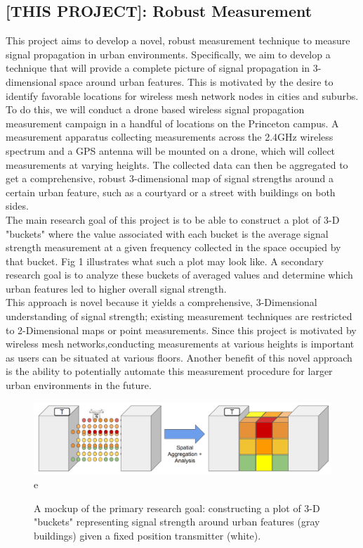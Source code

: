 \documentclass[pageno]{jpaper}
\begin{document}
\subsection{[THIS PROJECT]: Robust Measurement}
This project aims to develop a novel, robust measurement technique to measure signal propagation in urban environments. Specifically, we aim to develop a technique that will provide a complete picture of signal propagation in 3-dimensional space around urban features. This is motivated by the desire to identify favorable locations for wireless mesh network nodes in cities and suburbs. \\
To do this, we will conduct a drone based wireless signal propagation measurement campaign in a handful of locations on the Princeton campus. A measurement apparatus collecting measurements across the 2.4GHz wireless spectrum and a GPS antenna will be mounted on a drone, which will collect measurements at varying heights. The collected data can then be aggregated to get a comprehensive, robust 3-dimensional map of signal strengths around a certain urban feature, such as a courtyard or a street with buildings on both sides. \\

The main research goal of this project is to be able to construct a plot of 3-D  "buckets" where the value associated with each bucket is the average signal strength measurement at a given frequency collected in the space occupied by that bucket. Fig 1 illustrates what such a plot may look like. A secondary research goal is to analyze these buckets of averaged values and determine which urban features led to higher overall signal strength. \\

This approach is novel because it yields a comprehensive, 3-Dimensional understanding of signal strength; existing measurement techniques are restricted to 2-Dimensional maps or point measurements. Since this project is motivated by wireless mesh networks,conducting measurements at various heights is important as users can be situated at various floors. Another benefit of this novel approach is the ability to potentially automate this measurement procedure for larger urban environments in the future. \\

\begin{figure}[h]
	\caption{A mockup of the primary research goal: constructing a plot of 3-D "buckets" representing signal strength around urban features (gray buildings) given a fixed position transmitter (white).}
	\includegraphics{measurement_goal}e
	\centering
\end{figure}
\end{document}
